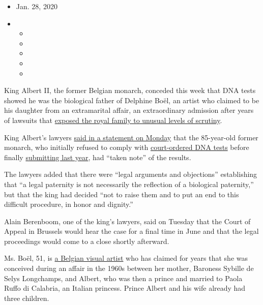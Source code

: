 \begin{itemize}
\item
  Jan. 28, 2020
\item
  \begin{itemize}
  \item
  \item
  \item
  \item
  \item
  \end{itemize}
\end{itemize}

King Albert II, the former Belgian monarch, conceded this week that DNA
tests showed he was the biological father of Delphine Boël, an artist
who claimed to be his daughter from an extramarital affair, an
extraordinary admission after years of lawsuits that
\href{https://www.nytimes.com/2013/07/20/world/europe/belgium-also-awaiting-possible-news-of-a-new-royal.html}{exposed
the royal family to unusual levels of scrutiny}.

King Albert's lawyers
\href{https://www.lesoir.be/275765/article/2020-01-27/le-roi-albert-ii-reconnait-etre-le-pere-biologique-de-delphine-boel-le}{said
in a statement on Monday} that the 85-year-old former monarch, who
initially refused to comply with
\href{https://www.nytimes.com/2018/11/05/world/europe/belgium-king-paternity.html}{court-ordered
DNA tests} before finally
\href{https://www.nytimes.com/2019/05/21/world/europe/belgium-king-albert-dna-test.html}{submitting
last year}, had ``taken note'' of the results.

The lawyers added that there were ``legal arguments and objections''
establishing that ``a legal paternity is not necessarily the reflection
of a biological paternity,'' but that the king had decided ``not to
raise them and to put an end to this difficult procedure, in honor and
dignity.''

Alain Berenboom, one of the king's lawyers, said on Tuesday that the
Court of Appeal in Brussels would hear the case for a final time in June
and that the legal proceedings would come to a close shortly afterward.

Ms. Boël, 51, is \href{https://www.delphineboel.com/}{a Belgian visual
artist} who has claimed for years that she was conceived during an
affair in the 1960s between her mother, Baroness Sybille de Selys
Longchamps, and Albert, who was then a prince and married to Paola Ruffo
di Calabria, an Italian princess. Prince Albert and his wife already had
three children.

